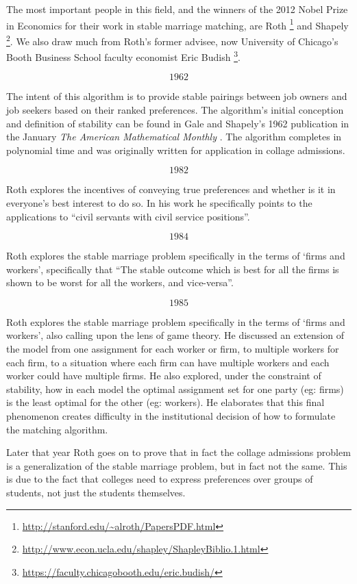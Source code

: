 The most important people in this field, and the winners of the 2012 Nobel Prize in Economics for their work in stable marriage matching, are Roth \footnote{\url{http://stanford.edu/~alroth/PapersPDF.html}} and Shapely \footnote{\url{http://www.econ.ucla.edu/shapley/ShapleyBiblio.1.html}}. We also draw much from Roth's former advisee, now University of Chicago's Booth Business School faculty economist Eric Budish \footnote{\url{https://faculty.chicagobooth.edu/eric.budish/}}.

\[1962\]

The intent of this algorithm is to provide stable pairings between job owners and job seekers based on their ranked preferences. The algorithm's initial conception and definition of stability can be found in Gale and Shapely's 1962 publication in the January \textit{The American Mathematical Monthly} \cite{1962_Gale}. The algorithm completes in polynomial time and was originally written for application in collage admissions.

\[1982\]

Roth explores the incentives of conveying true preferences and whether is it in everyone's best interest to do so. \cite{1982_Roth} In his work he specifically points to the applications to ``civil servants with civil service positions''.

\[1984\]

Roth explores the stable marriage problem specifically in the terms of `firms and workers', specifically that ``The stable outcome which is best for all the firms is shown to be worst for all the workers, and vice-versa''.\cite{1984_Roth}

\[1985\]

Roth explores the stable marriage problem specifically in the terms of `firms and workers', also calling upon the lens of game theory.\cite{1985_Roth} He discussed an extension of the model from one assignment for each worker or firm, to multiple workers for each firm, to a situation where each firm can have multiple workers and each worker could have multiple firms. He also explored, under the constraint of stability, how in each model the optimal assignment set for one party (eg: firms) is the least optimal for the other (eg: workers). He elaborates that this final phenomenon creates difficulty in the institutional decision of how to formulate the matching algorithm.

Later that year Roth goes on to prove that in fact the collage admissions problem is a generalization of the stable marriage problem, but in fact not the same. This is due to the fact that colleges need to express preferences over groups of students, not just the students themselves. \cite{1985_Roth_b}

